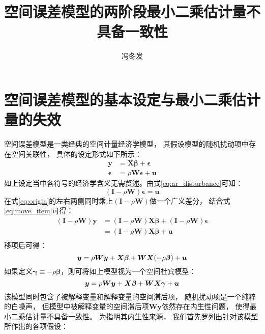 \documentclass[black,normal,authoryear]{elegantnote}
\title{空间误差模型的两阶段最小二乘估计量不具备一致性}
\author{冯冬发}
\institute{中国社会科学院大学（研究生院）}
\date{\zhtoday}
\newcommand{\bmw}{\bm{W}}
\newcommand{\bmi}{\bm{I}}
\newcommand{\cqref}[1]{式\eqref{#1}}
\begin{document}
    \maketitle

    \section{空间误差模型的基本设定与最小二乘估计量的失效}
    空间误差模型是一类经典的空间计量经济学模型，
    其假设模型的随机扰动项中存在空间关联性，
    具体的设定形式如下所示：
    \begin{align}
        \bm{y}&=\bm{X\beta}+\bm{\epsilon} \label{eq:origin}\\
        \bm{\epsilon}&=\rho\bm{W\epsilon}+\bm{u} \label{eq:ar_disturbance}
    \end{align}
    如上设定当中各符号的经济学含义无需赘述。由\cqref{eq:ar_disturbance}可知：
    \begin{equation}
        \label{eq:move_item}
        (\bmi-\rho\bmw)\bm{\epsilon}=\bm{u}
    \end{equation}
    在\cqref{eq:origin}的左右两侧同时乘上$(\bmi-\rho\bmw)$做一个广义差分，
    结合\cqref{eq:move_item}可得：
    \begin{equation}
       \begin{split}
            (\bmi-\rho\bmw)\bm{y}&=(\bmi-\rho\bmw)\bm{X\beta}+(\bmi-\rho\bmw)\bm{\epsilon}\\
            &=(\bmi-\rho\bmw)\bm{X\beta}+\bm{u}\\
       \end{split}
    \end{equation}
    移项后可得：
    \begin{equation}
        \bm{y}=\rho\bmw\bm{y}+\bm{X\beta}+\bmw\bm{X}(-\rho\bm{\beta})+\bm{u}\\
    \end{equation}
    如果定义$\bm{\gamma}\equiv-\rho\bm{\beta}$，则可将如上模型视为一个空间杜宾模型：
    \begin{equation}
        \label{eq:sdm}
        \bm{y}=\rho\bmw\bm{y}+\bm{X\beta}+\bmw\bm{X}\bm{\gamma}+\bm{u}\\
    \end{equation}
    该模型同时包含了被解释变量和解释变量的空间滞后项，
    随机扰动项是一个纯粹的白噪声，
    但模型中被解释变量的空间滞后项$\bm{Wy}$依然存在内生性问题，
    使得最小二乘估计量不具备一致性。
    为指明其内生性来源，
    我们首先罗列出\cite{kelejian1997}针对该模型所作出的各项假设：
\end{document}

